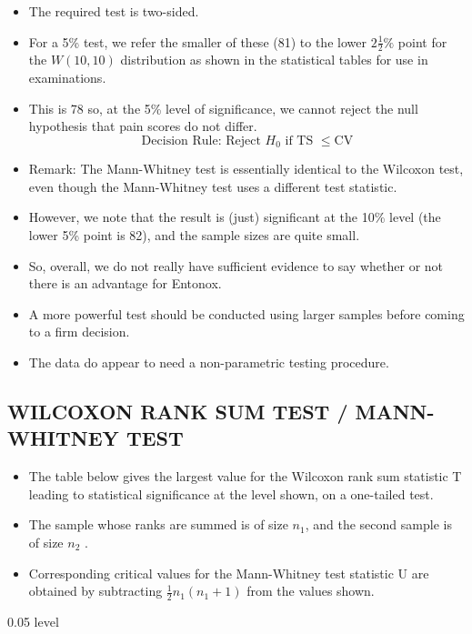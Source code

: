 \documentclass[a4paper,12pt]{article}
\begin{document}
\begin{itemize}
\item  The required test is two-sided.  
\item For a 5\% test, we refer the smaller of these (81) to the lower $2\frac{1}{2}\%$ point for the $W(10,10)$ distribution as shown in the statistical tables for use in examinations. 
\item This is 78 so, at the 5\% level of significance, we cannot reject the null hypothesis that pain scores do not differ.  
\[ \mbox{Decision Rule: Reject } H_0 \mbox{ if TS } \leq \mbox{CV} \] 
\item Remark: The Mann-Whitney test is essentially identical to the Wilcoxon test, even
though the Mann-Whitney test uses a different test statistic.
\item However, we note that the result is (just) significant at the 10\% level (the lower 5\% point is 82), and the sample sizes are quite small.
\item So, overall, we do not really have sufficient evidence to say whether or not there is an advantage for Entonox. 
\item A more powerful test should be conducted using larger samples before coming to a firm decision. 
\item The data do appear to need a non-parametric testing procedure.
\end{itemize}
\newpage 
\subsection*{WILCOXON RANK SUM TEST / MANN-WHITNEY TEST}
\begin{itemize}
    \item The table below gives the largest value for the Wilcoxon rank sum statistic T leading to
statistical significance at the level shown, on a one-tailed test. 
\item The sample whose ranks
are summed is of size $n_1$, and the second sample is of size $n_2$
.
\item Corresponding critical values for the Mann-Whitney test statistic U are obtained by
subtracting ${ \displaystyle \frac{1}{2} n_1 (n_1 + 1) }$ from the values shown.
\end{itemize}


0.05   level\\
\end{document}
